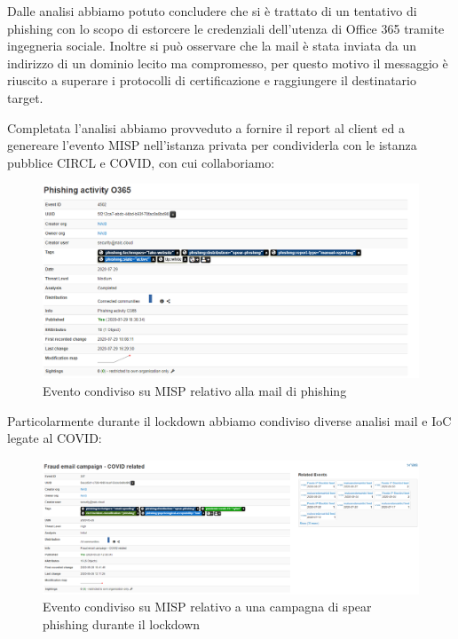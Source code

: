 Dalle analisi abbiamo potuto concludere che si è trattato di un tentativo di phishing con lo scopo di estorcere le credenziali dell’utenza di Office 365 tramite ingegneria sociale. Inoltre si può osservare che la mail è stata inviata da un indirizzo di un dominio lecito ma compromesso, per questo motivo il messaggio è riuscito a superare i protocolli di certificazione e raggiungere il destinatario target.\par

Completata l’analisi abbiamo provveduto a fornire il report al client ed a genereare l’evento MISP nell’istanza privata per condividerla con le istanza pubblice CIRCL e COVID, con cui collaboriamo:

\begin{figure}[h]
    \begin{center}
        \includegraphics[width=0.98\columnwidth]{images/4_caso_d'uso_img/mispShare1.png}
    \end{center}
    \caption{Evento condiviso su MISP relativo alla mail di phishing}
    \label{fig:Evento condiviso relativo alla mail di phishing}
\end{figure} 

\newpage

Particolarmente durante il lockdown abbiamo condiviso diverse analisi mail e IoC legate al COVID: 

\begin{figure}[h]
    \begin{center}
        \includegraphics[width=0.98\columnwidth]{images/4_caso_d'uso_img/mispShare2.png}
    \end{center}
    \caption{Evento condiviso su MISP relativo a una campagna di spear phishing durante il lockdown}
    \label{fig:Evento condiviso su MISP relativo a una campagna di spear phishing durante il lockdown}
\end{figure} 

